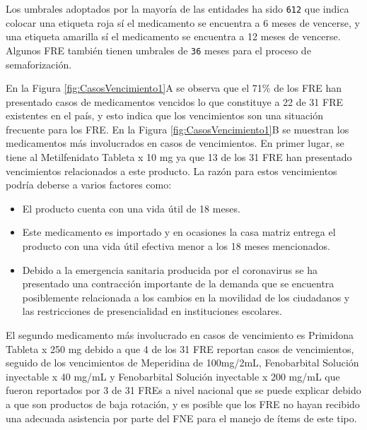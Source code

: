 \documentclass[
]{book}
\begin{document}
Los umbrales adoptados por la mayoría de las entidades ha sido \texttt{6\textbar{}12} que indica colocar una etiqueta roja sí el medicamento se encuentra a 6 meses de vencerse, y una etiqueta amarilla sí el medicamento se encuentra a 12 meses de vencerse. Algunos FRE también tienen umbrales de \texttt{3\textbar{}6} meses para el proceso de semaforización.

En la Figura \ref{fig:CasosVencimiento1}A se observa que el 71\% de los FRE han presentado casos de medicamentos vencidos lo que constituye a 22 de 31 FRE existentes en el país, y esto indica que los vencimientos son una situación frecuente para los FRE. En la Figura \ref{fig:CasosVencimiento1}B se muestran los medicamentos más involucrados en casos de vencimientos. En primer lugar, se tiene al Metilfenidato Tableta x 10 mg ya que 13 de los 31 FRE han presentado vencimientos relacionados a este producto. La razón para estos vencimientos podría deberse a varios factores como:

\begin{itemize}
\item
  El producto cuenta con una vida útil de 18 meses.
\item
  Este medicamento es importado y en ocasiones la casa matriz entrega el producto con una vida útil efectiva menor a los 18 meses mencionados.
\item
  Debido a la emergencia sanitaria producida por el coronavirus se ha presentado una contracción importante de la demanda que se encuentra posiblemente relacionada a los cambios en la movilidad de los ciudadanos y las restricciones de presencialidad en instituciones escolares.
\end{itemize}

El segundo medicamento más involucrado en casos de vencimiento es Primidona Tableta x 250 mg debido a que 4 de los 31 FRE reportan casos de vencimientos, seguido de los vencimientos de Meperidina de 100mg/2mL, Fenobarbital Solución inyectable x 40 mg/mL y Fenobarbital Solución inyectable x 200 mg/mL que fueron reportados por 3 de 31 FREs a nivel nacional que se puede explicar debido a que son productos de baja rotación, y es posible que los FRE no hayan recibido una adecuada asistencia por parte del FNE para el manejo de ítems de este tipo.
\end{document}
